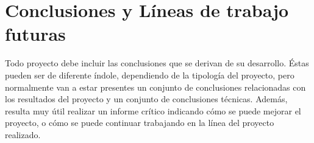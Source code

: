 \chapter{Conclusiones y Líneas de trabajo futuras} %
\label{cha:Conclusiones y Líneas de trabajo futuras}

Todo proyecto debe incluir las conclusiones que se derivan de su desarrollo.
Éstas pueden ser de diferente índole, dependiendo de la tipología del proyecto,
pero normalmente van a estar presentes un conjunto de conclusiones relacionadas
con los resultados del proyecto y un conjunto de conclusiones técnicas. Además,
resulta muy útil realizar un informe crítico indicando cómo se puede mejorar el
proyecto, o cómo se puede continuar trabajando en la línea del proyecto
realizado. 

